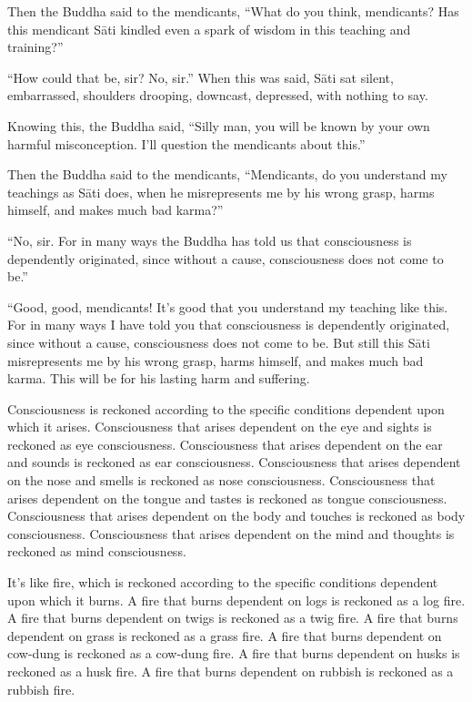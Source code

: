 \documentclass[12pt,openany]{book}%
\begin{document}
Then the Buddha said to the mendicants, “What do you think, mendicants? Has this mendicant \textsanskrit{Sāti} kindled even a spark of wisdom in this teaching and training?” 

“How could that be, sir? No, sir.” When this was said, \textsanskrit{Sāti} sat silent, embarrassed, shoulders drooping, downcast, depressed, with nothing to say. 

Knowing this, the Buddha said, “Silly man, you will be known by your own harmful misconception. I’ll question the mendicants about this.” 

Then the Buddha said to the mendicants, “Mendicants, do you understand my teachings as \textsanskrit{Sāti} does, when he misrepresents me by his wrong grasp, harms himself, and makes much bad karma?” 

“No, sir. For in many ways the Buddha has told us that consciousness is dependently originated, since without a cause, consciousness does not come to be.” 

“Good, good, mendicants! It’s good that you understand my teaching like this. For in many ways I have told you that consciousness is dependently originated, since without a cause, consciousness does not come to be. But still this \textsanskrit{Sāti} misrepresents me by his wrong grasp, harms himself, and makes much bad karma. This will be for his lasting harm and suffering. 

Consciousness is reckoned according to the specific conditions dependent upon which it arises. Consciousness that arises dependent on the eye and sights is reckoned as eye consciousness. Consciousness that arises dependent on the ear and sounds is reckoned as ear consciousness. Consciousness that arises dependent on the nose and smells is reckoned as nose consciousness. Consciousness that arises dependent on the tongue and tastes is reckoned as tongue consciousness. Consciousness that arises dependent on the body and touches is reckoned as body consciousness. Consciousness that arises dependent on the mind and thoughts is reckoned as mind consciousness. 

It’s like fire, which is reckoned according to the specific conditions dependent upon which it burns. A fire that burns dependent on logs is reckoned as a log fire. A fire that burns dependent on twigs is reckoned as a twig fire. A fire that burns dependent on grass is reckoned as a grass fire. A fire that burns dependent on cow-dung is reckoned as a cow-dung fire. A fire that burns dependent on husks is reckoned as a husk fire. A fire that burns dependent on rubbish is reckoned as a rubbish fire. 
\end{document}
